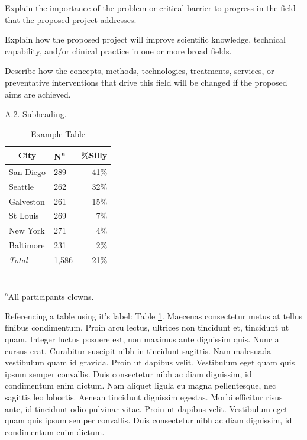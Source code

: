 \documentclass[11pt, notitlepage]{article} %
\begin{document}
Explain the importance of the problem or critical barrier to progress in the field that the proposed project addresses.

Explain how the proposed project will improve scientific knowledge, technical capability, and/or clinical practice in one or more broad fields.

Describe how the concepts, methods, technologies, treatments, services, or preventative interventions that drive this field will be changed if the proposed aims are achieved.

\begin{description}
	\item[A.2. Subheading.]{}
\end{description}

\begin{table} %
	\caption{Example Table}
	\begin{center}
		\begin{tabular}{l l r}
			\toprule
			\multicolumn{1}{c}{City} & {N\textsuperscript{a}} & {\%Silly}\\
			\midrule
			San Diego & 289 & 41\%\\
			Seattle & 262 & 32\%\\
			Galveston & 261 & 15\%\\
			St Louis & 269 & 7\%\\
			New York & 271 & 4\%\\
			Baltimore & 231 & 2\%\\
			\emph{Total} & 1,586 & 21\%\\
			\hline 
		\end{tabular}\\
		\footnotesize\textsuperscript{a}{All participants clowns.}
	\end{center}
	\label{tab:example}
\end{table}

Referencing a table using it's label: Table \ref{tab:example}. Maecenas consectetur metus at tellus finibus condimentum. Proin arcu lectus, ultrices non tincidunt et, tincidunt ut quam. Integer luctus posuere est, non maximus ante dignissim quis. Nunc a cursus erat. Curabitur suscipit nibh in tincidunt sagittis. Nam malesuada vestibulum quam id gravida. Proin ut dapibus velit. Vestibulum eget quam quis ipsum semper convallis. Duis consectetur nibh ac diam dignissim, id condimentum enim dictum. Nam aliquet ligula eu magna pellentesque, nec sagittis leo lobortis. Aenean tincidunt dignissim egestas. Morbi efficitur risus ante, id tincidunt odio pulvinar vitae. Proin ut dapibus velit. Vestibulum eget quam quis ipsum semper convallis. Duis consectetur nibh ac diam dignissim, id condimentum enim dictum.
\end{document}
